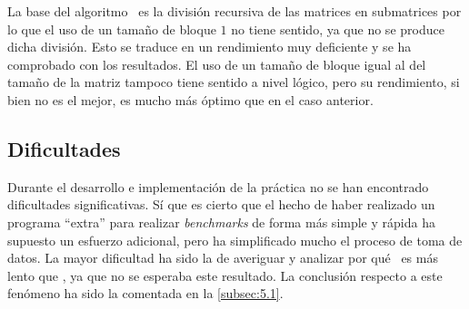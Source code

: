 La base del algoritmo \zorder\ es la división recursiva de las matrices en submatrices
por lo que el uso de un tamaño de bloque \(1\) no tiene sentido, ya que no se produce dicha división. Esto se traduce en un rendimiento muy deficiente y se ha comprobado con los resultados.
El uso de un tamaño de bloque igual al del tamaño de la matriz tampoco tiene sentido a nivel lógico, pero su rendimiento, si bien no es el mejor, es mucho más óptimo 
que en el caso anterior.  

\subsection{Dificultades}
Durante el desarrollo e implementación de la práctica no se han encontrado dificultades significativas. Sí que es cierto que el hecho de haber realizado 
un programa ``extra'' para realizar \textit{benchmarks} de forma más simple y rápida ha supuesto un esfuerzo adicional, pero ha simplificado mucho el proceso 
de toma de datos. La mayor dificultad ha sido la de averiguar y analizar por qué \rowmajor\ es más lento que \colmajor, ya que no se esperaba este resultado.
La conclusión respecto a este fenómeno ha sido la comentada en la \autoref{subsec:5.1}.